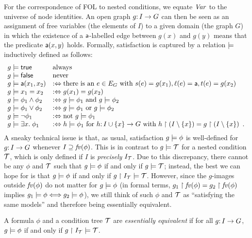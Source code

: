 For the correspondence of FOL to nested conditions, we equate $\mathit{Var}$ to the universe of node identities. An open graph $g{:}\, I\rightarrow G$ can then be seen as an assignment of free variables (the elements of $I$) to a given domain (the graph $G$) in which the existence of a $\mathsf{a}$-labelled edge between $g(x)$ and $g(y)$ means that the predicate $\mathsf{a}(x,y)$ holds. Formally, satisfaction is captured by a relation $\models$ inductively defined as follows:
%
\[\begin{array}{ll}
g\models \mathsf{true} & \text{always} \\
g\models \mathsf{false} & \text{never} \\
g\models \mathsf{a}(x_1,x_2) & :\Leftrightarrow \text{there is an } e\in E_G \text{ with } s(e)=g(x_1), \ell(e)=\mathsf{a}, t(e)=g(x_2) \\
g\models x_1=x_2 & :\Leftrightarrow g(x_1)=g(x_2) \\
g\models \phi_1\wedge \phi_2 & :\Leftrightarrow g\models \phi_1 \text{ and } g\models \phi_2 \\
g\models \phi_1\vee \phi_2 & :\Leftrightarrow g\models \phi_1 \text{ or } g\models \phi_2 \\
g\models \neg\phi_1 & :\Leftrightarrow \text{not } g\models \phi_1 \\
g\models \exists x.\; \phi_1  & :\Leftrightarrow h\models \phi_1 \text{ for } h{:}\, I\cup\{{x}\}\rightarrow G \text{ with } h\restriction (I\setminus \{{x}\}) =g\restriction (I\setminus \{{x}\}) \enspace.
\end{array}\]
%
A sneaky technical issue is that, as usual, satisfaction $g\models\phi$ is well-defined for $g{:}\, I\rightarrow G$ whenever $I\supseteq\mathit{fv}(\phi)$. This is in contrast to $g\models{\mathcal{T}}$ for a nested condition ${\mathcal{T}}$, which is only defined if $I$ is \emph{precisely} $I_{\mathcal{T}}$. Due to this discrepancy, there cannot be any $\phi$ and ${\mathcal{T}}$ such that $g\models \phi$ if and only if $g\models {\mathcal{T}}$; instead, the best we can hope for is that $g\models \phi$ if and only if $g\restriction I_{\mathcal{T}} \models {\mathcal{T}}$. However, since the $g$-images outside $\mathit{fv}(\phi)$ do not matter for $g\models \phi$ (in formal terms, $g_1\restriction \mathit{fv}(\phi)=g_2\restriction \mathit{fv}(\phi)$ implies $g_1\models\phi \Longleftrightarrow g_2\models\phi$), we still think of such $\phi$ and ${\mathcal{T}}$ as ``satisfying the same models'' and therefore being essentially equivalent.

\begin{definition}\label{def:essential-equivalence}
A formula $\phi$ and a condition tree ${\mathcal{T}}$ are \emph{essentially equivalent} if for all $g{:}\, I\rightarrow G$, $g\models \phi$ if and only if $g\restriction I_{\mathcal{T}}\models {\mathcal{T}}$.
\end{definition}


